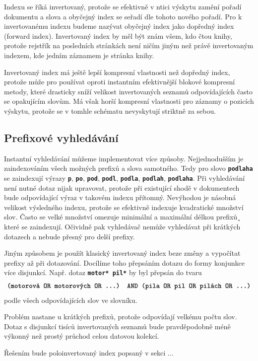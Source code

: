 \documentclass[11pt,letterpaper,oneside,openright]{book}
\newcommand{\bftt}[1]{\texttt{\textbf{#1}}}
\begin{document}
Indexu se říká invertovaný, protože se efektivně v ntici výskytu zamění pořadí
dokumentu a slova a obyčejný index se seřadí dle tohoto nového pořadí. Pro k
invertovanému indexu budeme nazývat obyčejný index jako dopředný index (forward
index). Invertovaný index by měl být znám všem, kdo čtou knihy, protože
rejstřík na posledních stránkách není ničím jiným než právě invertovaným
indexem, kde jedním záznamem je stránka knihy.

Invertovaný index má ještě lepší kompresní vlastnosti než dopředný index,
protože může pro používat oproti instantním efektivnější blokové kompresní
metody, které drasticky sníží velikost invertovaných seznamů odpovídajících
často se opakujícím slovům. Má však horší kompresní vlastnosti pro záznamy o
pozicích výskytu, protože se v tomhle schématu nevyskytují striktně za sebou.


\subsection{Prefixové vyhledávání} \label{sec:prefix_search}
Instantní vyhledávání můžeme implementovat více způsoby. Nejjednodušším je
zaindexováním všech možných prefixů a slova samotného. Tedy pro slovo
\bftt{podlaha} se zaindexují výrazy \bftt{p}, \bftt{po}, \bftt{pod},
\bftt{podl}, \bftt{podla}, \bftt{podlah}, \bftt{podlaha}. Při vyhledávání není
nutné dotaz nijak upravovat, protože při existující shodě v dokumentech bude
odpovídající výraz v takovém indexu přítomný. Nevýhodou je násobná velikost
výsledného indexu, protože se efektivně indexuje kvadratické množství slov.
Často se velké množství omezuje minimální a maximální délkou prefixů¸ které se
zaindexují.  Očividně pak vyhledávač nemůže vyhledávat při krátkých dotazech a
nebude přesný pro delší prefixy.

Jiným způsobem je použít klasický invertovaný index beze změny a vypočítat
prefixy až při dotazování.  Docílíme toho přepsáním dotazu do formy konjunkce
více disjunkcí. Např. dotaz \bftt{motor* pil*} by byl přepsán do tvaru
\[\bftt{(motorová OR motorových OR ...) AND (pila OR pil OR pilách OR ...)}\]
podle všech odpovídajících slov ve slovníku.

Problém nastane u krátkých prefixů, protože odpovídají velkému počtu slov.
Dotaz s disjunkcí tisíců invertovaných seznamů bude pravděpodobně méně výkonný
než prostý průchod celou datovou kolekcí.

Řešením bude poloinvertovaný index popsaný v sekci ...
\end{document}
